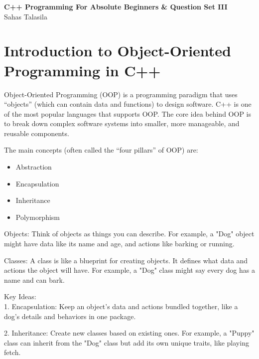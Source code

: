 \documentclass[a4paper,12pt]{article}
\begin{document}
\pagestyle{empty} 

\begin{titlepage}
    \centering
    \vspace*{2cm}
    \Huge{\textbf{C++ Programming For Absolute Beginners \& Question Set III}} \\[1.5cm]
    \Large{Sahas Talasila} \\[1cm]
    \vfill
\end{titlepage}

\tableofcontents
\newpage

\section{Introduction to Object-Oriented Programming in C++}
Object-Oriented Programming (OOP) is a programming paradigm that uses ``objects'' (which can contain data and functions) to design software. C++ is one of the most popular languages that supports OOP. The core idea behind OOP is to break down complex software systems into smaller, more manageable, and reusable components.

The main concepts (often called the ``four pillars'' of OOP) are:
\begin{itemize}
    \item Abstraction
    \item Encapsulation
    \item Inheritance
    \item Polymorphism
\end{itemize}

Objects: Think of objects as things you can describe. For example, a "Dog" object might have data like its name and age, and actions like barking or running.\

Classes: A class is like a blueprint for creating objects. It defines what data and actions the object will have. For example, a "Dog" class might say every dog has a name and can bark.

Key Ideas:\\
1. Encapsulation: Keep an object's data and actions bundled together, like a dog's details and behaviors in one package.

2. Inheritance: Create new classes based on existing ones. For example, a "Puppy" class can inherit from the "Dog" class but add its own unique traits, like playing fetch.
\end{document}
